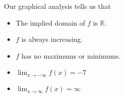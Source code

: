 \documentclass{ximera}
\begin{document}
\begin{example}
\begin{image}
\end{image}




Our graphical analysis tells us that

\begin{itemize}
\item The implied domain of $f$ is $\mathbb{R}$.
\item $f$ is always increasing.
\item $f$ has no maximums or minimums.
\item $\lim_{x \to -\infty} f(x) = -7$
\item $\lim_{x \to \infty} f(x) = \infty$
\end{itemize}





\end{example}
\end{document}

